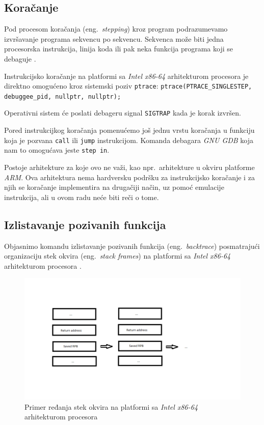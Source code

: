 \documentclass[12pt,oneside]{memoir}
\begin{document}
\subsection{Koračanje}

Pod procesom koračanja (eng.~\emph{stepping}) kroz program podrazumevamo izvršavanje programa sekvencu po sekvencu. Sekvenca može biti jedna procesorska instrukcija, linija koda ili pak neka funkcija programa koji se debaguje \cite{GDB}.

Instrukcijsko koračanje na platformi sa \emph{Intel x86-64} arhitekturom procesora je direktno omogućeno kroz sistemski poziv \texttt{ptrace}:\newline
\texttt{ptrace(PTRACE\_SINGLESTEP, debuggee\_pid, nullptr, nullptr);}
\newline

Operativni sistem će poslati debageru signal \texttt{SIGTRAP} kada je korak izvršen.

Pored instrukcijkog koračanja pomenućemo još jednu vrstu koračanja u funkciju koja je pozvana \texttt{call} ili \texttt{jump} instrukcijom. Komanda debagara \emph{GNU GDB} koja nam to omogućava jeste \texttt{step in}.

Postoje arhitekture za koje ovo ne važi, kao npr.~arhitekture u okviru platforme \emph{ARM}. Ova arhitektura nema hardversku podršku za instrukcijsko koračanje i za njih se koračanje implementira na drugačiji način, uz pomoć emulacije instrukcija, ali u ovom radu neće biti reči o tome.

\subsection{Izlistavanje pozivanih funkcija}

Objasnimo komandu izlistavanje pozivanih funkcija (eng.~\emph{backtrace}) posmatrajući organizaciju stek okvira (eng.~\emph{stack frames}) na platformi sa \emph{Intel x86-64} arhitekturom procesora \cite{GDB}.

\begin{figure}[H]
	\begin{center}
		\includegraphics[scale=0.6]{slike/stack_frame.png}
	\end{center}
	\caption{Primer ređanja stek okvira na platformi sa \emph{Intel x86-64} arhitekturom procesora}
	\label{fig:stack}
\end{figure}
\end{document}
